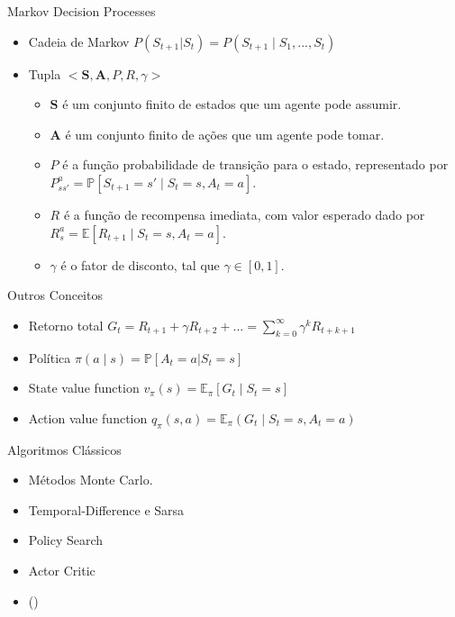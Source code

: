 \documentclass{beamer}
\begin{document}
\begin{frame}{Markov Decision Processes}
\begin{itemize}
\item
	Cadeia de Markov $P(S_{t+1} | S_t) = P(S_{t+1} \mid S_1, ..., S_t)$
\item
	Tupla $<\textbf{S}, \textbf{A}, P, R, \gamma>$
	\begin{itemize}
	\item
		$\textbf{S}$ é um conjunto finito de estados que um agente pode assumir.
	\item
		$\textbf{A}$ é um conjunto finito de ações que um agente pode tomar.
	\item
		$P$ é a função probabilidade de transição para o estado, representado por $P_{ss'}^a = \mathbb{P}[S_{t+1}=s' \mid S_t = s, A_t = a]$.
	\item
		$R$ é a função de recompensa imediata, com valor esperado dado por $R_s^a = \mathbb{E}[R_{t+1} \mid S_t = s, A_t = a]$.
	\item
		$\gamma$ é o fator de disconto, tal que $\gamma \in [0,1]$.
	\end{itemize}
\end{itemize}
\end{frame}

\begin{frame}{Outros Conceitos}
\begin{itemize}
\setlength\itemsep{1em}
\item
	Retorno total $G_t = R_{t+1} + \gamma R_{t+2} + ... = \sum_{k=0}^{\infty}{\gamma^k R_{t+k+1}}$
\item
	Política $\pi(a \mid s) = \mathbb{P}[A_t=a | S_t=s]$
\item
	State value function $v_{\pi}(s) = \mathbb{E}_{\pi}[G_t \mid S_t = s]$
\item
	Action value function $q_{\pi}(s,a) = \mathbb{E}_{\pi}(G_t \mid S_t = s, A_t = a)$	
\end{itemize}
\end{frame}

\begin{frame}{Algoritmos Clássicos}
\begin{itemize}
\setlength\itemsep{1em}
\item
	Métodos Monte Carlo.
\item
	Temporal-Difference e Sarsa
\item
	Policy Search
\item
	Actor Critic
\item
	(\cite{Sutton1998})
\end{itemize}
\end{frame}
\end{document}
